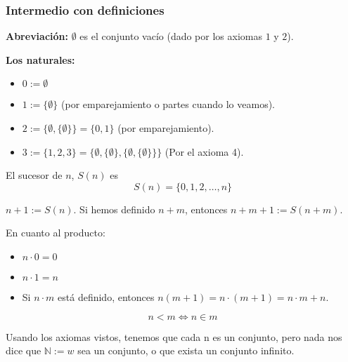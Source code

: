 	\subsubsection{Intermedio con definiciones}
	
	\textbf{Abreviación: } $\emptyset$ es el conjunto vacío (dado por los axiomas $1$ y $2$).
	
	\textbf{Los naturales:} 
	\begin{itemize}
		\item $0:=\emptyset$
		\item $1:=\{\emptyset\}$ (por emparejamiento o partes cuando lo veamos).
		\item $2:=\{\emptyset, \{\emptyset\}\} = \{0,1\}$ (por emparejamiento).
		\item $3:=\{1,2,3\} = \{\emptyset,\{\emptyset\},\{\emptyset, \{\emptyset\}\}\}$ (Por el axioma 4).
	\end{itemize}
	\begin{defn}[Sucesor]
		El sucesor de $n$, $S(n)$ es $$S(n) = \{0,1,2,\hdots, n\}$$
	\end{defn}
	
	\begin{defn}
		$n+1 := S(n)$. Si hemos definido $n+m$, entonces
		$n+m+1 := S(n+m)$.
	\end{defn}
	
	\begin{defn}
		En cuanto al producto:
		\begin{itemize}
			\item $n\cdot0 = 0$
			\item $n\cdot1=n$
			\item Si $n\cdot m$ está definido, entonces $n(m+1) = n\cdot (m+1) = n\cdot m + n$.
		\end{itemize}
	\end{defn}
	
	\begin{defn}[Menor]
		$$n<m\iff n\in m$$
	\end{defn}
	
	Usando los axiomas vistos, tenemos que cada n es un conjunto, pero nada nos dice que $\mathbb{N} :=w$ sea un conjunto, o que exista un conjunto infinito.
	
